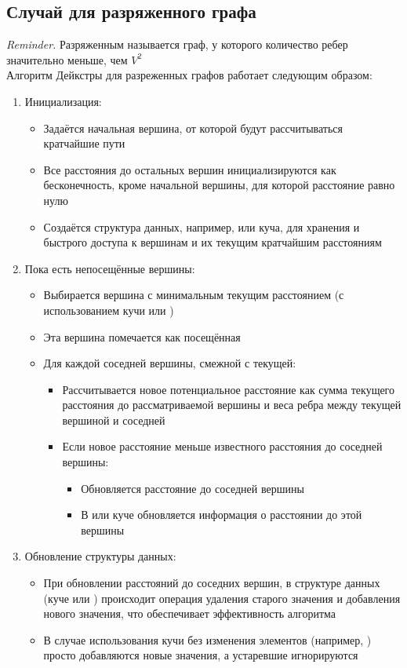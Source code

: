 \documentclass[a4paper]{article}
\begin{document}
\subsection*{Случай для разряженного графа}
\indent \textit{Reminder.} Разряженным называется граф, у которого количество ребер значительно меньше, чем $V^2$ \\[2mm]
Алгоритм Дейкстры для разреженных графов работает следующим образом:
\begin{enumerate}
    \item Инициализация:
    \begin{itemize}
        \item Задаётся начальная вершина, от которой будут рассчитываться кратчайшие пути
        \item Все расстояния до остальных вершин инициализируются как бесконечность, кроме начальной вершины, для которой расстояние равно нулю
        \item Создаётся структура данных, например,  или куча, для хранения и быстрого доступа к вершинам и их текущим кратчайшим расстояниям
    \end{itemize}
    \item Пока есть непосещённые вершины:
    \begin{itemize}
        \item Выбирается вершина с минимальным текущим расстоянием (с использованием кучи или )
        \item Эта вершина помечается как посещённая
        \item Для каждой соседней вершины, смежной с текущей:
        \begin{itemize}
            \item Рассчитывается новое потенциальное расстояние как сумма текущего расстояния до рассматриваемой вершины и веса ребра между текущей вершиной и соседней
            \item Если новое расстояние меньше известного расстояния до соседней вершины:
            \begin{itemize}
                \item Обновляется расстояние до соседней вершины
                \item В  или куче обновляется информация о расстоянии до этой вершины
            \end{itemize}
        \end{itemize}
    \end{itemize}
    \item Обновление структуры данных:
    \begin{itemize}
        \item При обновлении расстояний до соседних вершин, в структуре данных (куче или ) происходит операция удаления старого значения и добавления нового значения, что обеспечивает эффективность алгоритма
        \item В случае использования кучи без изменения элементов (например, ) просто добавляются новые значения, а устаревшие игнорируются
    \end{itemize}
\end{enumerate}
\end{document}
